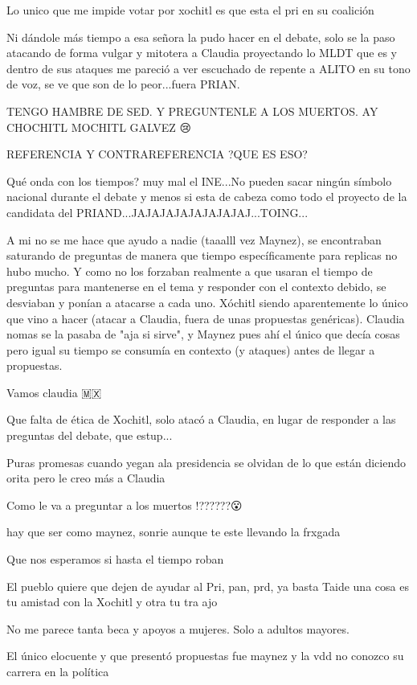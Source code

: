 Lo unico que me impide votar por xochitl es que esta el pri en su coalición

Ni dándole más tiempo a esa señora la pudo hacer en el debate, solo se la paso atacando de forma vulgar y mitotera a Claudia proyectando lo MLDT que es y dentro de sus ataques  me pareció a ver escuchado de repente a ALITO en su tono de voz, se ve que son de lo peor...fuera PRIAN.

TENGO HAMBRE DE SED. Y PREGUNTENLE A LOS MUERTOS.  AY CHOCHITL MOCHITL GALVEZ 😢

REFERENCIA Y CONTRAREFERENCIA ?QUE ES ESO?

Qué onda con los tiempos? muy mal el INE...No pueden sacar ningún símbolo nacional durante el debate y menos si esta de cabeza como todo el proyecto de la candidata del PRIAND...JAJAJAJAJAJAJAJAJ...TOING...

A mi no se me hace que ayudo a nadie (taaalll vez Maynez), se encontraban saturando de preguntas de manera que tiempo específicamente para replicas no hubo mucho. Y como no los forzaban realmente a que usaran el tiempo de preguntas para mantenerse en el tema y responder con el contexto debido, se desviaban y ponían a atacarse a cada uno. Xóchitl siendo aparentemente lo único que vino a hacer (atacar a Claudia, fuera de unas propuestas genéricas). Claudia nomas se la pasaba de "aja si sirve", y Maynez pues ahí el único que decía cosas pero igual su tiempo se consumía en contexto (y ataques) antes de llegar a propuestas.

Vamos claudia 🇲🇽

Que falta de ética de Xochitl, solo atacó a Claudia, en lugar de responder a las preguntas del debate, que estup...

Puras promesas cuando yegan ala presidencia se olvidan de lo que están diciendo orita pero le creo más a Claudia

Como le va a preguntar a los muertos !??????😮

hay que ser como maynez, sonrie aunque te este llevando la frxgada

Que nos esperamos si hasta el tiempo roban

El pueblo quiere que dejen de ayudar al Pri, pan, prd, ya basta Taide una cosa es tu amistad con la Xochitl y otra tu tra ajo

No me parece tanta beca y apoyos a mujeres. Solo a adultos mayores.

El único elocuente y que presentó propuestas fue maynez y la vdd no conozco su carrera en la política

